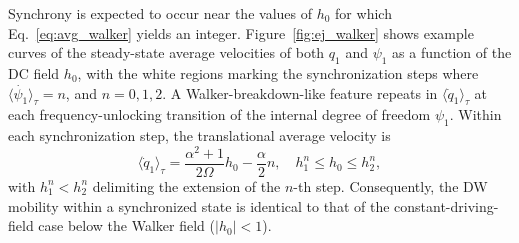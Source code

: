 \documentclass[prb,aps,twocolumn,superscriptaddress,floatfix]{revtex4-1}
\begin{document}
Synchrony is expected to occur near the values of $h_0$ for which Eq.~\eqref{eq:avg_walker} yields an integer. Figure~\ref{fig:ej_walker} shows example curves of the steady-state average velocities of both $q_{1}$ and $\psi_{1}$ as a function of the DC field $h_0$, with the white regions marking the synchronization steps where $\langle \dot{\psi_{1}} \rangle_{\tau} = n$, and $n =0,1,2$. A Walker-breakdown-like feature repeats in $\langle \dot q_1 \rangle_\tau$ at each frequency-unlocking transition of the internal degree of freedom $\psi_1$. Within each synchronization step, the translational average velocity is
%
\begin{equation}
    \langle\dot q_1 \rangle_\tau  = \dfrac{\alpha^{2}+1}{2\Omega}h_{0}-\dfrac{\alpha}{2}n, \quad h^{n}_{1}\leq h_{0} \leq h^{n}_{2},
\end{equation}
%
with $h^{n}_{1}<h^{n}_{2}$ delimiting the extension of the $n$-th step. Consequently, the DW mobility within a synchronized state is identical to that of the constant-driving-field case below the Walker field ($|h_0|<1$).
\end{document}
